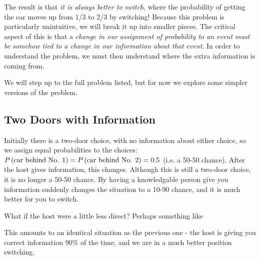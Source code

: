The result is that {\em it is always better to switch}, where the probability of getting the car moves up from 1/3 to 2/3 by switching!
Because this problem is particularly unintuitive, we will break it up into smaller pieces.   The critical aspect of this is that a {\em change in our assignment of probability to an event must be somehow tied to a change in our information about that event}.  In order to understand the problem, we must then understand where the extra information is coming from.

We will step up to the full problem listed, but for now we explore some simpler versions of the problem.
\subsection{Two Doors with Information}


Initially there is a two-door choice, with no information about either choice, so we assign equal probabilities to the choices:  $\P{car behind No. 1}=\P{car behind No. 2}=0.5$ (i.e. a 50-50 chance).  After the host gives information, this changes.  Although this is still a two-door choice, it is no longer a 50-50 chance.  By having a knowledgable person give you information suddenly changes the situation to a 10-90 chance, and it is much better for you to switch.

What if the host were a little less direct?  Perhaps something like

This amounts to an identical situation as the previous one - the host is giving you correct information 90\% of the time, and we are in a much better position switching.

